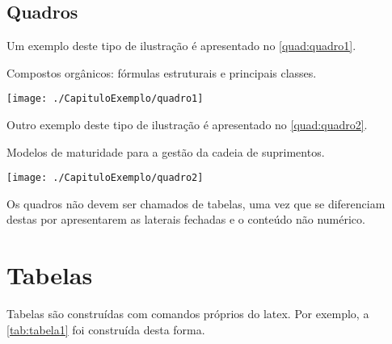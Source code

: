 \subsection{Quadros}\label{sec:quadros}

Um exemplo deste tipo de ilustração é apresentado no \autoref{quad:quadro1}.

\begin{tabframed}[htb]%
\captionsetup{width=0.5\textwidth}%
\caption{Compostos orgânicos: fórmulas estruturais e principais classes.}%
\label{quad:quadro1}%
\texttt{[image: ./CapituloExemplo/quadro1]}%
\end{tabframed}

Outro exemplo deste tipo de ilustração é apresentado no \autoref{quad:quadro2}.

\begin{tabframed}[htb]%
\captionsetup{width=0.7\textwidth}%
\caption{Modelos de maturidade para a gestão da cadeia de suprimentos.}%
\label{quad:quadro2}%
\texttt{[image: ./CapituloExemplo/quadro2]}%
\end{tabframed}

Os quadros não devem ser chamados de tabelas, uma vez que se diferenciam destas por apresentarem as laterais fechadas e o conteúdo não numérico.

\section{Tabelas}\label{sec:tabelas}

Tabelas são construídas com comandos próprios do \gls{latex}. Por exemplo, a \autoref{tab:tabela1} foi construída desta forma.

